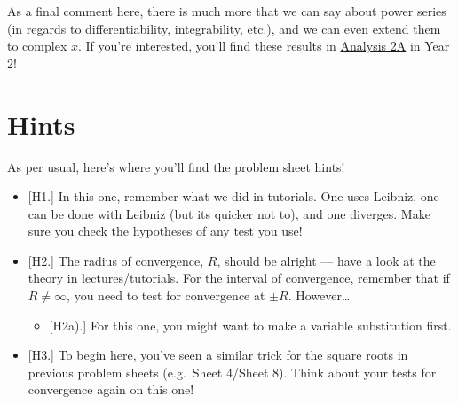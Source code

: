\documentclass[
  10pt,
  a4paper]{article}
\providecommand{\tightlist}{%
  \setlength{\itemsep}{0pt}\setlength{\parskip}{0pt}}
\theoremstyle{plain}
\theoremstyle{definition}
\theoremstyle{plain}
\theoremstyle{plain}
\theoremstyle{plain}
\theoremstyle{plain}
\theoremstyle{definition}
\theoremstyle{definition}
\theoremstyle{remark}
\theoremstyle{remark}
\begin{document}
As a final comment here, there is much more that we can say about power series (in regards to differentiability, integrability, etc.), and we can even extend them to complex \(x\). If you're interested, you'll find these results in \href{https://www.bath.ac.uk/catalogues/2022-2023/ma/MA20218.html}{Analysis 2A} in Year 2!

\hypertarget{hints}{%
\section{Hints}\label{hints}}

As per usual, here's where you'll find the problem sheet hints!

\begin{itemize}
\tightlist
\item
  {[}H1.{]} In this one, remember what we did in tutorials. One uses Leibniz, one can be done with Leibniz (but its quicker not to), and one diverges. Make sure you check the hypotheses of any test you use!
\item
  {[}H2.{]} The radius of convergence, \(R\), should be alright --- have a look at the theory in lectures/tutorials. For the interval of convergence, remember that if \(R \neq \infty\), you need to test for convergence at \(\pm R\). However\ldots{}

  \begin{itemize}
  \tightlist
  \item
    {[}H2a).{]} For this one, you might want to make a variable substitution first.
  \end{itemize}
\item
  {[}H3.{]} To begin here, you've seen a similar trick for the square roots in previous problem sheets (e.g.~Sheet 4/Sheet 8). Think about your tests for convergence again on this one!
\end{itemize}
\end{document}
